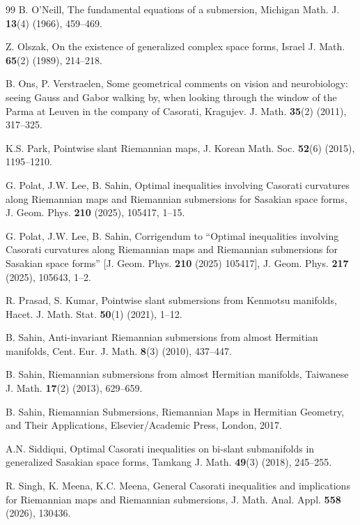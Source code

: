 \documentclass[11pt]{amsart}
\theoremstyle{plain}
\theoremstyle{definition}
\theoremstyle{remark}
\begin{document}
\begin{thebibliography}{99}
B. O'Neill, The fundamental equations of a submersion,
Michigan Math. J. \textbf{13}(4) (1966), 459--469.

Z. Olszak, On the existence of generalized complex space forms,
Israel J. Math. \textbf{65}(2) (1989), 214--218.

B. Ons, P. Verstraelen, Some geometrical comments on vision and neurobiology:
seeing Gauss and Gabor walking by, when looking through the window of the Parma
at Leuven in the company of Casorati,
Kragujev. J. Math. \textbf{35}(2) (2011), 317--325.

K.S. Park, Pointwise slant Riemannian maps,
J. Korean Math. Soc. \textbf{52}(6) (2015), 1195--1210.

G. Polat, J.W. Lee, B. Sahin, Optimal inequalities involving Casorati
curvatures along Riemannian maps and Riemannian submersions for Sasakian space
forms, J. Geom. Phys. \textbf{210} (2025), 105417, 1--15.

G. Polat, J.W. Lee, B. Sahin, Corrigendum to ``Optimal inequalities involving
Casorati curvatures along Riemannian maps and Riemannian submersions for
Sasakian space forms'' [J. Geom. Phys. \textbf{210} (2025) 105417],
J. Geom. Phys. \textbf{217} (2025), 105643, 1--2.


R. Prasad, S. Kumar, Pointwise slant submersions from Kenmotsu manifolds,
Hacet. J. Math. Stat. \textbf{50}(1) (2021), 1--12.

B. Sahin, Anti-invariant Riemannian submersions from almost Hermitian
manifolds, Cent. Eur. J. Math. \textbf{8}(3) (2010), 437--447.

B. Sahin, Riemannian submersions from almost Hermitian manifolds,
Taiwanese J. Math. \textbf{17}(2) (2013), 629--659.

B. Sahin, Riemannian Submersions, Riemannian Maps in Hermitian Geometry, and
Their Applications, Elsevier/Academic Press, London, 2017.

A.N. Siddiqui, Optimal Casorati inequalities on bi-slant submanifolds in
generalized Sasakian space forms,
Tamkang J. Math. \textbf{49}(3) (2018), 245--255.

R. Singh, K. Meena, K.C. Meena, General Casorati inequalities and implications
for Riemannian maps and Riemannian submersions,
J. Math. Anal. Appl. \textbf{558} (2026), 130436.


\end{thebibliography}
\end{document}

